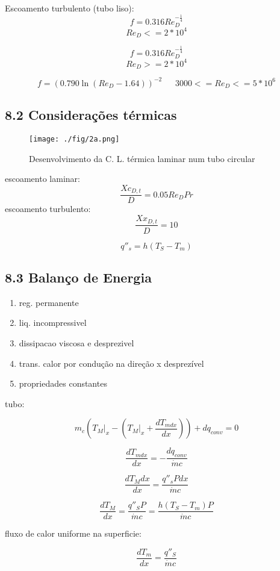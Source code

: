 \documentclass[a4paper, 12pt]{article}
\begin{document}
Escoamento turbulento (tubo liso): 
\[f=0.316 Re_{D}^{-\frac{1}{4}}\]
\[Re_{D} <= 2 * 10^{4}\]

\[f=0.316 Re_{D}^{-\frac{1}{4}}\]
\[Re_{D} >= 2*10^{4}\]

\[ f = (0.790 \ln (Re_{D} -1.64))^{-2}\ \ \ \ \ \ \ 3000 <= Re_{D} <= 5 * 10^{6} \]

\subsection*{8.2 Considerações térmicas}

\begin{figure}[h]
\begin{center}
\texttt{[image: ./fig/2a.png]}
\caption{\label{fig:2}Desenvolvimento da C. L. térmica laminar num tubo circular} 
\end{center}
\end{figure}

escoamento laminar: 
\[\frac{Xc_{D,t}}{D}=0.05Re_{D}Pr\]
escoamento turbulento:
\[\frac{Xx_{D,t}}{D}=10\]

\[q''_{s}=h(T_{S}-T_{m})\]

\subsection*{8.3 Balanço de Energia}

\begin{enumerate}
\item reg. permanente
\item liq. incompressivel
\item dissipacao viscosa e desprezivel
\item trans. calor por condução na direção x desprezível
\item propriedades constantes
\end{enumerate}


tubo:

\[m_{c} ( T_{M}|_{x} - ( T_{M}|_{x} + \frac{dT_{m dx}}{dx} ) ) + dq_{conv} = 0\]

\[\frac{dT_{m dx}}{dx} = - \frac{dq_{conv}}{\dot{m}c}\]

\[\frac{dT_{M} dx}{dx} = \frac{q''_{s} Pdx}{\dot{m}c}\]

\[\frac{dT_{M}}{dx}= \frac{q''_{S} P}{\dot{m}c} = \frac{h(T_{S} - T_{m}) P}{\dot{m}c}\]

fluxo de calor uniforme na superficie:

\[\frac{dT_{m}}{dx}= \frac{q''_{S}}{\dot{m}c}\]
\end{document}
